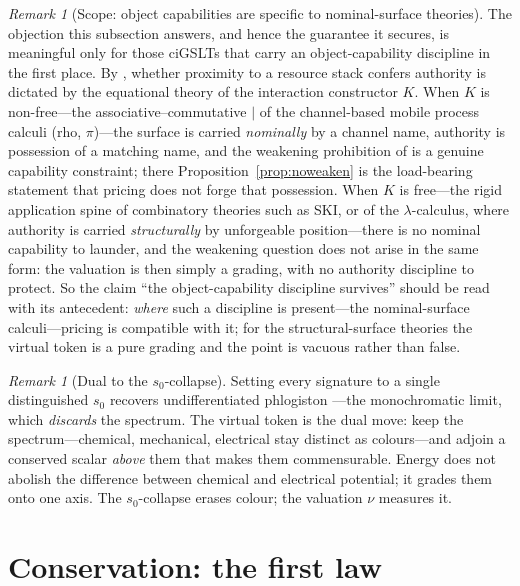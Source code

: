 \documentclass[11pt]{article}
\theoremstyle{definition}
\theoremstyle{plain}
\theoremstyle{remark}
\newtheorem{remark}[definition]{Remark}
\begin{document}
\begin{remark}[Scope: object capabilities are specific to nominal-surface theories]
\label{rmk:scope}
The objection this subsection answers, and hence the guarantee it secures, is meaningful only for
those ciGSLTs that carry an object-capability discipline in the first place. By \cite[\S10]{CE},
whether proximity to a resource stack confers authority is dictated by the equational theory of the
interaction constructor $K$. When $K$ is non-free---the associative--commutative $\mid$ of the
channel-based mobile process calculi (rho, $\pi$)---the surface is carried \emph{nominally} by a
channel name, authority is possession of a matching name, and the weakening prohibition of
\cite[\S4.8.5]{CARho} is a genuine capability constraint; there Proposition~\ref{prop:noweaken} is
the load-bearing statement that pricing does not forge that possession. When $K$ is free---the
rigid application spine of combinatory theories such as SKI, or of the $\lambda$-calculus, where
authority is carried \emph{structurally} by unforgeable position---there is no nominal capability
to launder, and the weakening question does not arise in the same form: the valuation is then
simply a grading, with no authority discipline to protect. So the claim ``the object-capability
discipline survives'' should be read with its antecedent: \emph{where} such a discipline is
present---the nominal-surface calculi---pricing is compatible with it; for the structural-surface
theories the virtual token is a pure grading and the point is vacuous rather than false.
\end{remark}

\begin{remark}[Dual to the $s_0$-collapse]
Setting every signature to a single distinguished $s_0$ recovers undifferentiated phlogiston
\cite[\S6, Rmk.~5.1]{CARho}---the monochromatic limit, which \emph{discards} the spectrum. The
virtual token is the dual move: keep the spectrum---chemical, mechanical, electrical stay distinct
as colours---and adjoin a conserved scalar \emph{above} them that makes them commensurable. Energy
does not abolish the difference between chemical and electrical potential; it grades them onto one
axis. The $s_0$-collapse erases colour; the valuation $\nu$ measures it.
\end{remark}

\section{Conservation: the first law}
\label{sec:first}
\end{document}
